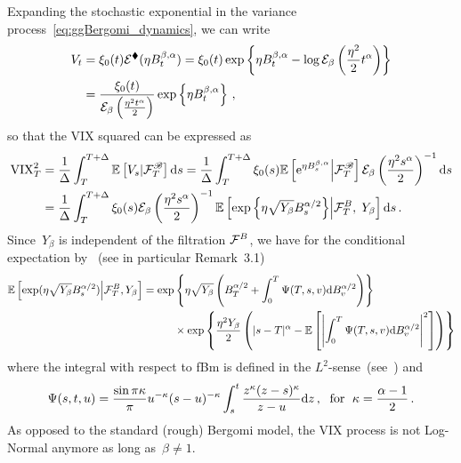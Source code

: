 Expanding the stochastic exponential in the variance process~\eqref{eq:ggBergomi_dynamics}, we can write
\begin{align}\label{eq:ggBergomi_expanded_variance}
    V_t &= \xi_0(t) \mathcal{E}^\blacklozenge(\eta B^{\beta, \alpha}_t) = \xi_0(t)\exp\left\{\eta B^{\beta, \alpha}_t - \log \mathcal{E}_{\beta}\left(\frac{\eta^2}{2} t^\alpha\right) \right\} \\
    &= \frac{\xi_0(t)}{\mathcal{E}_{\beta}\left(\frac{\eta^2 t^\alpha}{2}\right)} \exp\left\{\eta B^{\beta, \alpha}_t\right\}\,,
\end{align}
so that the VIX squared can be expressed as
\begin{align*}
    \mathrm{VIX}_T^2 &= \frac{1}{\Delta} \int_T^{T+\Delta}\mathbb{E}\left[V_s| \mathcal{F}^{\mathscr{B}}_T\right] \mathrm{d} s = \frac{1}{\Delta} \int_T^{T+\Delta} \xi_0(s)\mathbb{E}\left[\mathrm{e}^{\eta B^{\beta, \alpha}_s}\middle\vert \mathcal{F}^{\mathscr{B}}_T\right]
    \mathcal{E}_{\beta}\left(\frac{\eta^2 s^\alpha}{2}\right)^{-1} \mathrm{d} s \\
    &= \frac{1}{\Delta} \int_T^{T+\Delta} \xi_0(s)\mathcal{E}_{\beta}\left(\frac{\eta^2 s^\alpha}{2}\right)^{-1} \mathbb{E}\left[\exp\left\{\eta\sqrt{Y_\beta} B_s^{\alpha/2}\right\}\middle\vert \mathcal{F}_T^B, \; Y_\beta\right]  \mathrm{d} s\,.
\end{align*}
Since~$Y_\beta$ is independent of the filtration $\mathcal{F}^B$, we have for the conditional expectation by~\cite[Theorem 3.1]{Fink2013ConditionalMotion} (see in particular Remark~3.1)
\begin{align*}
    \mathbb{E}\left[\exp(\eta\sqrt{Y_\beta} B_s^{\alpha/2})\middle\vert \mathcal{F}_T^B, Y_\beta\right] &= \exp\left\{\eta\sqrt{Y_\beta}\left(B_T^{\alpha/2} + \int_0^T \Psi(T,s,v)\mathrm{d} B_v^{\alpha/2}\right)\right\} \\
    & \hspace{1cm} \times \exp\left\{\frac{\eta^2 Y_\beta}{2}\left(|s-T|^\alpha - \mathbb{E}\left[\left|\int_0^T \Psi(T,s,v)\mathrm{d} B_v^{\alpha/2}\right|^2\right]\right)\right\}
\end{align*}
where the integral with respect to fBm is defined in the $L^2$-sense~(see~\cite[Theorem~4.2]{Pipiras2001AreComplete}) and
\begin{equation}\label{eq:Psi}
\Psi(s,t,u) = \frac{\sin \pi \kappa}{\pi} u^{-\kappa}(s-u)^{-\kappa} \int_s^t \frac{z^\kappa(z-s)^\kappa}{z-u} \mathrm{d} z\,, \; \textup{ for } \; \kappa = \frac{\alpha-1}{2}\,.
\end{equation}
As opposed to the standard (rough) Bergomi model, 
the VIX process is not Log-Normal anymore as long as~$\beta\ne 1$.


